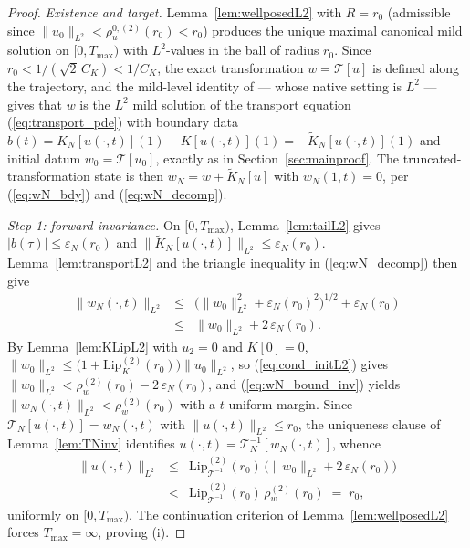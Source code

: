 \documentclass[10pt,a4paper]{amsart}
\newcommand{\Tcal}{\mathcal{T}}
\newcommand{\Ltwo}{L^2}
\newcommand{\Lipk}{\mathrm{Lip}_K}
\newcommand{\LipT}{\mathrm{Lip}_{\Tcal^{-1}}}
\newcommand{\eps}{\varepsilon}
\begin{document}
\begin{proof}
\emph{Existence and target.} Lemma~\ref{lem:wellposedL2} with $R = r_0$ (admissible since $\|u_0\|_{\Ltwo} < \rho_u^{0,(2)}(r_0) < r_0$) produces the unique maximal canonical mild solution on $[0, T_{\max})$ with $\Ltwo$-values in the ball of radius $r_0$. Since $r_0 < 1/(\sqrt{2}\,C_K) < 1/C_K$, the exact transformation $w = \Tcal[u]$ is defined along the trajectory, and the mild-level identity of \cite{krstic2026feedbacklinearizationhyperbolicpdes} --- whose native setting is $\Ltwo$ --- gives that $w$ is the $\Ltwo$ mild solution of the transport equation (\ref{eq:transport_pde}) with boundary data $b(t) = K_N[u(\cdot,t)](1) - K[u(\cdot,t)](1) = -\widetilde K_N[u(\cdot,t)](1)$ and initial datum $w_0 = \Tcal[u_0]$, exactly as in Section~\ref{sec:mainproof}. The truncated-transformation state is then $w_N = w + \widetilde K_N[u]$ with $w_N(1,t) = 0$, per (\ref{eq:wN_bdy}) and (\ref{eq:wN_decomp}).

\emph{Step 1: forward invariance.} On $[0, T_{\max})$, Lemma~\ref{lem:tailL2} gives $|b(\tau)| \le \eps_N(r_0)$ and $\|\widetilde K_N[u(\cdot,t)]\|_{\Ltwo} \le \eps_N(r_0)$. Lemma~\ref{lem:transportL2} and the triangle inequality in (\ref{eq:wN_decomp}) then give
\begin{eqnarray}
\|w_N(\cdot,t)\|_{\Ltwo} &\le& \bigl(\|w_0\|_{\Ltwo}^2 + \eps_N(r_0)^2\bigr)^{1/2} + \eps_N(r_0) \nonumber \\
&\le& \|w_0\|_{\Ltwo} + 2\,\eps_N(r_0).
\label{eq:wN_bound_inv}
\end{eqnarray}
By Lemma~\ref{lem:KLipL2} with $u_2 = 0$ and $K[0] = 0$, $\|w_0\|_{\Ltwo} \le \bigl(1 + \Lipk^{(2)}(r_0)\bigr)\|u_0\|_{\Ltwo}$, so (\ref{eq:cond_initL2}) gives $\|w_0\|_{\Ltwo} < \rho_w^{(2)}(r_0) - 2\,\eps_N(r_0)$, and (\ref{eq:wN_bound_inv}) yields $\|w_N(\cdot,t)\|_{\Ltwo} < \rho_w^{(2)}(r_0)$ with a $t$-uniform margin. Since $\Tcal_N[u(\cdot,t)] = w_N(\cdot,t)$ with $\|u(\cdot,t)\|_{\Ltwo} \le r_0$, the uniqueness clause of Lemma~\ref{lem:TNinv} identifies $u(\cdot,t) = \Tcal_N^{-1}[w_N(\cdot,t)]$, whence
\begin{eqnarray}
\|u(\cdot,t)\|_{\Ltwo} &\le& \LipT^{(2)}(r_0)\,\bigl(\|w_0\|_{\Ltwo} + 2\,\eps_N(r_0)\bigr) \nonumber \\
&<& \LipT^{(2)}(r_0)\,\rho_w^{(2)}(r_0) \;=\; r_0,
\label{eq:u_margin_L2}
\end{eqnarray}
uniformly on $[0, T_{\max})$. The continuation criterion of Lemma~\ref{lem:wellposedL2} forces $T_{\max} = \infty$, proving (i).


\end{proof}
\end{document}
